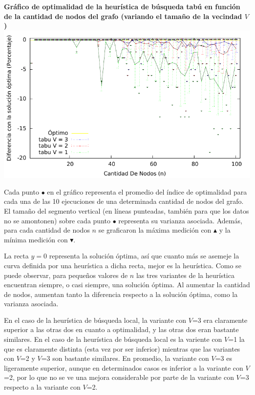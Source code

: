 \begin{center}
\textbf{Gráfico de optimalidad de la heurística de búsqueda tabú
en función\\de la cantidad de nodos del grafo (variando el tamaño de la
vecindad $V$)}
\includegraphics[scale=1.3]{imgs/opt_tabu_100_2_10.pdf}
\end{center}

\par{Cada punto $\bullet$ en el gráfico representa el promedio del índice de
optimalidad para cada una de las 10 ejecuciones de una determinada cantidad de
nodos del grafo. El tamaño del segmento vertical (en líneas punteadas, también
para que los datos no se amontonen) sobre cada punto $\bullet$
representa su varianza asociada. Además, para cada cantidad de nodos $n$ se
graficaron la máxima medición con $\blacktriangle$ y la mínima medición con
$\blacktriangledown$.}\\

\par{La recta $y=0$ representa la solución óptima, así que cuanto más se
asemeje la curva definida por una heurística a dicha recta, mejor es la
heurística. Como se puede observar, para pequeños valores de $n$ las tres
variantes de la heurística encuentran siempre, o casi siempre, una solución
óptima. Al aumentar la cantidad de nodos, aumentan tanto la diferencia
respecto a la solución óptima, como la varianza asociada.}\\

\par{En el caso de la heurística de búsqueda local, la variante con $V$=3 era
claramente superior a las otras dos en cuanto a optimalidad, y las otras dos
eran bastante similares. En el caso de la heurística de búsqueda local es la
variente con $V$=1 la que es claramente distinta (esta vez por ser inferior)
mientras que las variantes con $V$=2 y $V$=3 son bastante similares. En
promedio, la variante con $V$=3 es ligeramente superior, aunque en determinados
casos es inferior a la variante con $V$=2, por lo que no se ve una mejora
considerable por parte de la variante con $V$=3 respecto a la variante
con $V$=2.}\\

